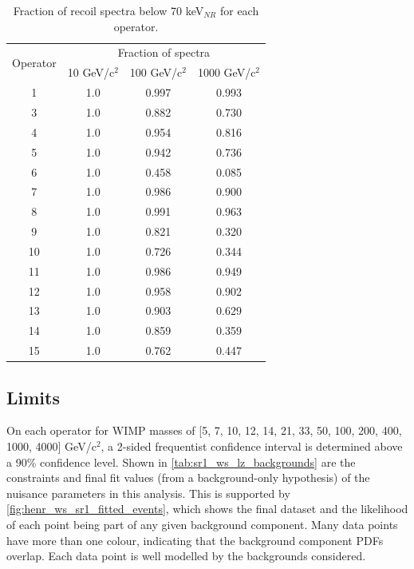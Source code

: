 \begin{table}[]
    \centering
    \begin{tabular}{c|c|c|c}
    
        \multirow{2}{*}{Operator} & \multicolumn{3}{c}{Fraction of spectra} \\ 
                                  & 10 GeV/c$^2$ & 100 GeV/c$^2$ & 1000 GeV/c$^2$ \\ \hline
        1                         & 1.0          & 0.997         & 0.993 \\
        3                         & 1.0          & 0.882         & 0.730 \\
        4                         & 1.0          & 0.954         & 0.816 \\
        5                         & 1.0          & 0.942         & 0.736 \\
        6                         & 1.0          & 0.458         & 0.085 \\
        7                         & 1.0          & 0.986         & 0.900 \\
        8                         & 1.0          & 0.991         & 0.963 \\
        9                         & 1.0          & 0.821         & 0.320 \\
        10                        & 1.0          & 0.726         & 0.344 \\
        11                        & 1.0          & 0.986         & 0.949 \\
        12                        & 1.0          & 0.958         & 0.902 \\
        13                        & 1.0          & 0.903         & 0.629 \\
        14                        & 1.0          & 0.859         & 0.359 \\
        15                        & 1.0          & 0.762         & 0.447
    \end{tabular}
    \caption{Fraction of recoil spectra below 70 keV$_{NR}$ for each operator.}
    \label{tab:sr1_signal_integrated_rates}
\end{table}



\subsection{Limits}
\par
On each operator for WIMP masses of [5, 7, 10, 12, 14, 21, 33, 50, 100, 200, 400, 1000, 4000] GeV/c$^2$, a 2-sided frequentist confidence interval is determined above a 90\% confidence level.
Shown in \autoref{tab:sr1_ws_lz_backgrounds} are the constraints and final fit values (from a background-only hypothesis) of the nuisance parameters in this analysis.
This is supported by \autoref{fig:henr_ws_sr1_fitted_events}, which shows the final dataset and the likelihood of each point being part of any given background component.
Many data points have more than one colour, indicating that the background component PDFs overlap.
Each data point is well modelled by the backgrounds considered.

